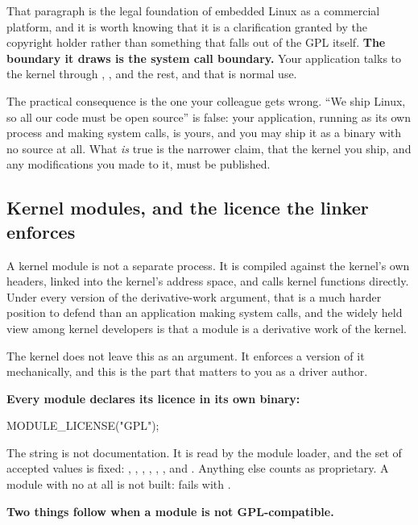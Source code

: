 That paragraph is the legal foundation of embedded Linux as a commercial platform, and it is worth
knowing that it is a clarification granted by the copyright holder rather than something that falls
out of the GPL itself. \textbf{The boundary it draws is the system call boundary.} Your application
talks to the kernel through , ,  and the rest, and that is normal
use.

The practical consequence is the one your colleague gets wrong. ``We ship Linux, so all our code
must be open source'' is false: your application, running as its own process and making system
calls, is yours, and you may ship it as a binary with no source at all. What \emph{is} true is the
narrower claim, that the kernel you ship, and any modifications you made to it, must be published.

\subsection{Kernel modules, and the licence the linker enforces}
\label{c1:app:b4}

A kernel module is not a separate process. It is compiled against the kernel's own headers, linked
into the kernel's address space, and calls kernel functions directly. Under every version of the
derivative-work argument, that is a much harder position to defend than an application making system
calls, and the widely held view among kernel developers is that a module is a derivative work of the
kernel.

The kernel does not leave this as an argument. It enforces a version of it mechanically, and this is
the part that matters to you as a driver author.

\textbf{Every module declares its licence in its own binary:}

\begin{ccode}
MODULE_LICENSE("GPL");
\end{ccode}

\noindent The string is not documentation. It is read by the module loader, and the set of accepted
values is fixed: , , , , , , and . Anything else
counts as proprietary. A module with no  at all is not built: 
fails with .

\textbf{Two things follow when a module is not GPL-compatible.}

